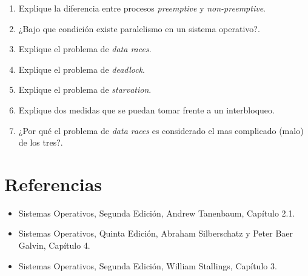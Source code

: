 \begin{enumerate}
	\item Explique la diferencia entre procesos \textit{preemptive} y
	\textit{non-preemptive}.

	\item ¿Bajo que condición existe paralelismo en un sistema operativo?.

	\item Explique el problema de \textit{data races}.

	\item Explique el problema de \textit{deadlock}.

	\item Explique el problema de \textit{starvation}.

	\item Explique dos medidas que se puedan tomar frente a un interbloqueo.

	\item ¿Por qué el problema de \textit{data races} es considerado el mas
	complicado (malo) de los tres?.

\end{enumerate}

\section{Referencias}
\begin{itemize}

	\item Sistemas Operativos, Segunda Edición, Andrew Tanenbaum, Capítulo
	2.1.

	\item Sistemas Operativos, Quinta Edición, Abraham Silberschatz y Peter
	Baer Galvin, Capítulo 4.

	\item Sistemas Operativos, Segunda Edición, William Stallings, Capítulo
	3.

\end{itemize}
